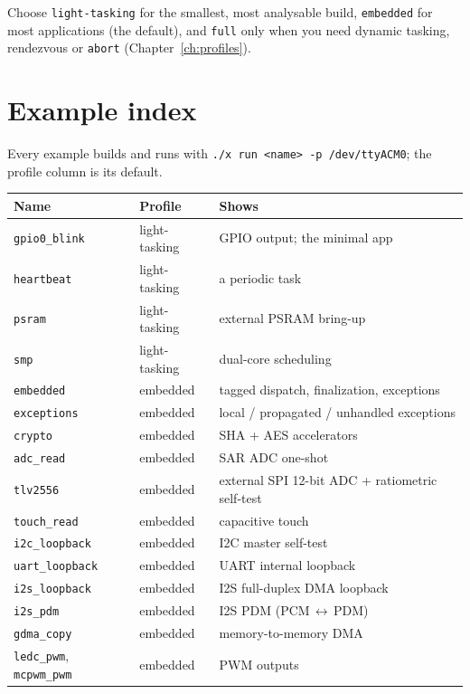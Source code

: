 Choose \texttt{light-tasking} for the smallest, most analysable build,
\texttt{embedded} for most applications (the default), and \texttt{full} only when
you need dynamic tasking, rendezvous or \texttt{abort}
(Chapter~\ref{ch:profiles}).

\section{Example index}
\label{app:examples}

Every example builds and runs with \texttt{./x run <name> -p /dev/ttyACM0}; the
profile column is its default.

\begin{center}\small
\begin{longtable}{@{}l l l@{}}
\toprule
\textbf{Name} & \textbf{Profile} & \textbf{Shows} \\ \midrule
\endhead
\texttt{gpio0\_blink}    & light-tasking & GPIO output; the minimal app \\
\texttt{heartbeat}       & light-tasking & a periodic task \\
\texttt{psram}           & light-tasking & external PSRAM bring-up \\
\texttt{smp}             & light-tasking & dual-core scheduling \\
\texttt{embedded}        & embedded & tagged dispatch, finalization, exceptions \\
\texttt{exceptions}      & embedded & local / propagated / unhandled exceptions \\
\texttt{crypto}          & embedded & SHA + AES accelerators \\
\texttt{adc\_read}       & embedded & SAR ADC one-shot \\
\texttt{tlv2556}         & embedded & external SPI 12-bit ADC + ratiometric self-test \\
\texttt{touch\_read}     & embedded & capacitive touch \\
\texttt{i2c\_loopback}   & embedded & I2C master self-test \\
\texttt{uart\_loopback}  & embedded & UART internal loopback \\
\texttt{i2s\_loopback}   & embedded & I2S full-duplex DMA loopback \\
\texttt{i2s\_pdm}        & embedded & I2S PDM (PCM\,$\leftrightarrow$\,PDM) \\
\texttt{gdma\_copy}      & embedded & memory-to-memory DMA \\
\texttt{ledc\_pwm}, \texttt{mcpwm\_pwm} & embedded & PWM outputs \\

\end{longtable}
\end{center}
